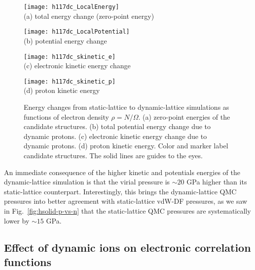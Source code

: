 \begin{figure}[h]
\centering
\begin{minipage}{0.49\textwidth}
\centering
\texttt{[image: h117dc\_LocalEnergy]}\\
(a) total energy change (zero-point energy)
\end{minipage}
\begin{minipage}{0.49\textwidth}
\centering
\texttt{[image: h117dc\_LocalPotential]}\\
(b) potential energy change
\end{minipage}
\begin{minipage}{0.49\textwidth}
\centering
\texttt{[image: h117dc\_skinetic\_e]}\\
(c) electronic kinetic energy change
\end{minipage}
\begin{minipage}{0.49\textwidth}
\centering
\texttt{[image: h117dc\_skinetic\_p]}\\
(d) proton kinetic energy
\end{minipage}
\caption{Energy changes from static-lattice to dynamic-lattice simulations as functions of electron density $\rho=N/\Omega$. (a) zero-point energies of the candidate structures. (b) total potential energy change due to dynamic protons. (c) electronic kinetic energy change due to dynamic protons. (d) proton kinetic energy. Color and marker label candidate structures. The solid lines are guides to the eyes.}
\label{fig:hsolid-ion-energy}
\end{figure}

An immediate consequence of the higher kinetic and potentials energies of the dynamic-lattice simulation is that the virial pressure is $\sim 20$ GPa higher than its static-lattice counterpart.
Interestingly, this brings the dynamic-lattice QMC pressures into better agreement with static-lattice vdW-DF pressures, as we saw in Fig.~\ref{fig:hsolid-p-vs-n} that the static-lattice QMC pressures are systematically lower by $\sim 15$ GPa.

\subsection{Effect of dynamic ions on electronic correlation functions}

